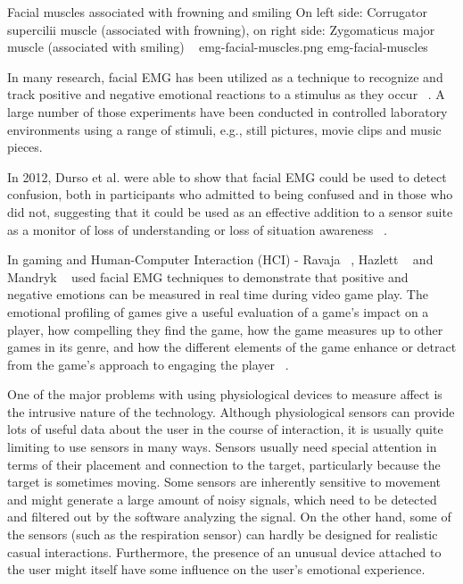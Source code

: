 \img
{Facial muscles associated with frowning and smiling}
{On left side: Corrugator supercilii muscle (associated with frowning), on right side: Zygomaticus major muscle (associated with smiling) ~\cite{wiki2014facial}}
{emg-facial-muscles.png}
{emg-facial-muscles}

In many research, facial EMG has been utilized as a technique to recognize and track positive and negative emotional reactions to a stimulus as they occur ~\cite{wolf2005facial}. A large number of those experiments have been conducted in controlled laboratory environments using a range of stimuli, e.g., still pictures, movie clips and music pieces.

In 2012, Durso et al. were able to show that facial EMG could be used to detect confusion, both in participants who admitted to being confused and in those who did not, suggesting that it could be used as an effective addition to a sensor suite as a monitor of loss of understanding or loss of situation awareness ~\cite{durso2012detecting}.

In gaming and Human-Computer Interaction (HCI) - Ravaja ~\cite{ravaja2008psychophysiology}, Hazlett ~\cite{hazlett2006measuring} and Mandryk ~\cite{mandryk2007fuzzy} used facial EMG techniques to demonstrate that positive and negative emotions can be measured in real time during video game play. The emotional profiling of games give a useful evaluation of a game's impact on a player, how compelling they find the game, how the game measures up to other games in its genre, and how the different elements of the game enhance or detract from the game's approach to engaging the player ~\cite{nacke2010affective}.

One of the major problems with using physiological devices to measure affect is the intrusive nature of the technology. Although physiological sensors can provide lots of useful data about the user in the course of interaction, it is usually quite limiting to use sensors in many ways. Sensors usually need special attention in terms of their placement and connection to the target, particularly because the target is sometimes moving. Some sensors are inherently sensitive to movement and might generate a large amount of noisy signals, which need to be detected and filtered out by the software analyzing the signal. On the other hand, some of the sensors (such as the respiration sensor) can hardly be designed for realistic casual interactions. Furthermore, the presence of an unusual device attached to the user might itself have some influence on the user's emotional experience.

